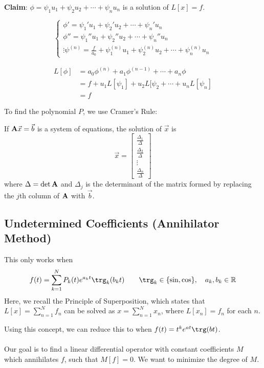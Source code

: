 \documentclass[12pt]{article}
\begin{document}
\textbf{Claim}: $\phi = \psi_1u_1 + \psi_2u_2 + \cdots + \psi_nu_n$ is a solution of $L[x] = f$.

\[
\begin{cases}
  \phi' = \psi_1'u_1 + \psi_2'u_2 + \cdots + \psi_n'u_n \\
  \phi'' = \psi_1''u_1 + \psi_2''u_2 + \cdots + \psi_n''u_n \\
  \vdots
  \psi^{(n)} = \frac{f}{a_0} + \psi_1^{(n)}u_1 + \psi_2^{(n)}u_2 + \cdots + \psi_n^{(n)}u_n
\end{cases}
\]

\[
\begin{aligned}
  L[\phi] &= a_0\phi^{(n)} + a_1\phi^{(n-1)} + \cdots + a_n\phi \\
  &= f + u_1L[\psi_1]+ u_2L[\psi_2 + \cdots + u_nL[\psi_n] \\
    &= f
\end{aligned}
\]

To find the polynomial $P$, we use Cramer's Rule:
\begin{theorem}
If ${\bf A}\vec{x} = \vec{b}$ is a system of equations, the solution of $\vec{x}$ is
\[ \vec{x} = \begin{bmatrix}
\frac{\Delta_1}{\Delta} \\ \frac{\Delta_2}{\Delta} \\ \vdots \\ \frac{\Delta_n}{\Delta}
\end{bmatrix} \]
where $\Delta = \det{\bf A}$ and $\Delta_j$ is the determinant of the matrix formed by replacing the $j$th column of ${\bf A}$ with $\vec{b}$.
\end{theorem}

\subsection{Undetermined Coefficients (Annihilator Method)}
This only works when \[ f(t) = \sum_{k=1}^N P_k(t)e^{a_kt}\trg_k(b_kt) \qquad \trg_k \in \{ \sin, \cos \}, \quad a_k,b_k \in \mathbb{R}\]
Here, we recall the Principle of Superposition, which states that $L[x] = \displaystyle\sum_{n=1}^Nf_n$ can be solved as $x = \displaystyle\sum_{n=1}^Nx_n$, where $L[x_n] = f_n$ for each $n$.

Using this concept, we can reduce this to when $f(t) = t^ke^{a t}\trg(bt)$. \\ \\
Our goal is to find a linear differential operator with constant coefficients $M$ which annihilates $f$, such that $M[f] = 0$. We want to minimize the degree of $M$.
\end{document}
